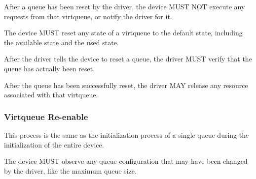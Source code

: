 
After a queue has been reset by the driver, the device MUST NOT execute
any requests from that virtqueue, or notify the driver for it.

The device MUST reset any state of a virtqueue to the default state,
including the available state and the used state.


After the driver tells the device to reset a queue, the driver MUST verify that
the queue has actually been reset.

After the queue has been successfully reset, the driver MAY release any
resource associated with that virtqueue.

\subsubsection{Virtqueue Re-enable}\label{sec:Basic Facilities of a Virtio Device / Virtqueues / Virtqueue Reset / Virtqueue Re-enable}

This process is the same as the initialization process of a single queue during
the initialization of the entire device.


The device MUST observe any queue configuration that may have been
changed by the driver, like the maximum queue size.


